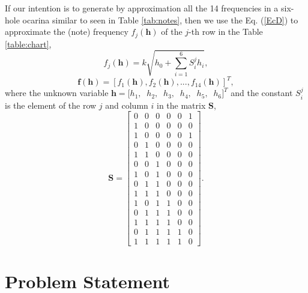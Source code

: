 \documentclass[11pt,twocolumn]{article}
\begin{document}
If our intention is to generate by approximation all the 14 frequencies in a six-hole ocarina
similar to seen in Table \ref{tab:notes}, then we 
use the Eq. (\ref{EcD}) to approximate the (note) frequency $f_j(\mathbf{h})$ of the $j$-th row in the Table \ref{table:chart},
\begin{equation} \label{EcDbh}
f_j(\mathbf{h}) = k \sqrt{h_0 +\sum_{i=1}^{6}{S^{j}_{i} h_i}},
\end{equation}
\begin{equation} \label{EcDbvech}
\mathbf{f}(\mathbf{h})=\left[f_1(\mathbf{h}), f_2(\mathbf{h}), ..., f_{14}(\mathbf{h})\right]^{T},
\end{equation}
where the unknown variable $\mathbf{h}=[h_{1},$ $~h_{2},$ $~h_{3},$ $~h_{4},$ $~h_{5},$ $~h_{6}]^T$
and 
the constant $S_{i}^{j}$ is the element of the row $j$ and column $i$ in the matrix $\mathbf{S}$,
\begin{equation}
 \mathbf{S}=
\begin{bmatrix}
0 & 0 & 0 & 0 & 0 & 1 \\
1 & 0 & 0 & 0 & 0 & 0 \\
1 & 0 & 0 & 0 & 0 & 1 \\
0 & 1 & 0 & 0 & 0 & 0 \\ 
1 & 1 & 0 & 0 & 0 & 0 \\ 
0 & 0 & 1 & 0 & 0 & 0 \\
1 & 0 & 1 & 0 & 0 & 0 \\ 
0 & 1 & 1 & 0 & 0 & 0 \\ 
1 & 1 & 1 & 0 & 0 & 0 \\ 
1 & 0 & 1 & 1 & 0 & 0 \\ 
0 & 1 & 1 & 1 & 0 & 0 \\ 
1 & 1 & 1 & 1 & 0 & 0 \\
0 & 1 & 1 & 1 & 1 & 0 \\
1 & 1 & 1 & 1 & 1 & 0 
\end{bmatrix}.
\end{equation}



\section{Problem Statement}
\end{document}
